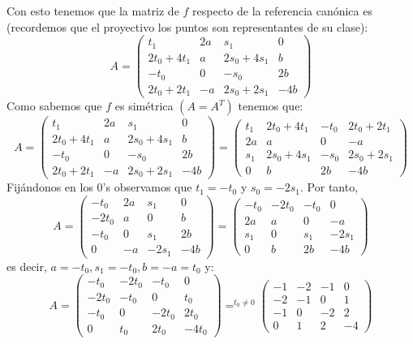 \documentclass[10pt,a4paper,openright]{book}
\theoremstyle{break}
\begin{document}
Con esto tenemos que la matriz de $f$ respecto de la referencia canónica es (recordemos que el proyectivo los puntos son representantes de su clase):
\[
    A = \begin{pmatrix} t_1 & 2a & s_1 & 0\\ 
    2t_0 + 4t_1 & a & 2s_0 + 4s_1 & b\\
    -t_0 & 0 & -s_0 & 2b\\
    2t_0 + 2t_1 & -a & 2s_0 + 2s_1 & -4b\end{pmatrix} 
\]
Como sabemos que $f$ es simétrica $\left( A = A^T \right)$ tenemos que:
\[
    A = \begin{pmatrix} t_1 & 2a & s_1 & 0\\ 
    2t_0 + 4t_1 & a & 2s_0 + 4s_1 & b\\
    -t_0 & 0 & -s_0 & 2b\\
    2t_0 + 2t_1 & -a & 2s_0 + 2s_1 & -4b\end{pmatrix} 
    = 
    \begin{pmatrix} t_1 & 2t_0 + 4t_1 & -t_0 & 2t_0 + 2t_1\\ 
    2a & a & 0 & -a\\
    s_1 & 2s_0 + 4s_1 & -s_0 & 2s_0 + 2s_1\\
    0 & b & 2b & -4b\end{pmatrix} 
\]
Fijándonos en los $0$'s observamos que $t_1 = -t_0$ y $s_0 = -2s_1$. Por tanto,
\[
    A = \begin{pmatrix} -t_0 & 2a & s_1 & 0\\ 
    -2t_0 & a & 0 & b\\
    -t_0 & 0 & s_1 & 2b\\
    0 & -a & -2s_1 & -4b\end{pmatrix} 
    = 
    \begin{pmatrix} -t_0 & -2t_0 & -t_0 & 0\\ 
    2a & a & 0 & -a\\
    s_1 & 0 & s_1 & -2s_1\\
    0 & b & 2b & -4b\end{pmatrix} 
\]
es decir, $a = -t_0, s_1 = -t_0, b = -a = t_0$ y:
\[
    A = \begin{pmatrix} -t_0 & -2t_0 & -t_0 & 0\\ 
    -2t_0 & -t_0 & 0 & t_0\\
    -t_0 & 0 & -2t_0 & 2t_0\\
    0 & t_0 & 2t_0 & -4t_0\end{pmatrix} 
    =^{t_0 \neq 0}  
    \begin{pmatrix} -1 & -2 & -1 & 0\\ 
    -2 & -1 & 0 & 1\\
    -1 & 0 & -2 & 2\\
    0 & 1 & 2 & -4\end{pmatrix} 
\]
\end{document}
